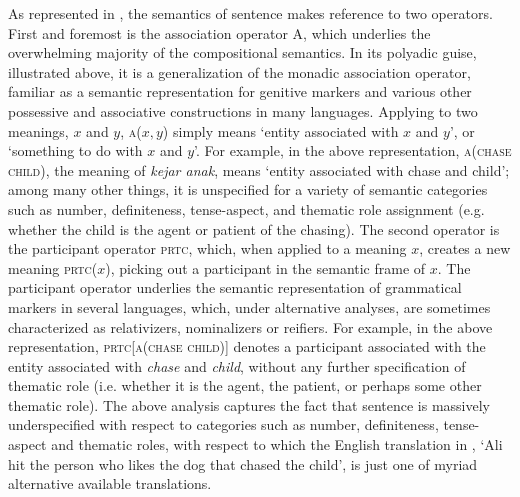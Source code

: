 \documentclass[output=paper]{langscibook}
\begin{document}
As represented in , the semantics of sentence  makes reference to two operators. First and foremost is the association operator A, which underlies the overwhelming majority of the compositional semantics. In its polyadic guise, illustrated above, it is a generalization of the monadic association operator, familiar as a semantic representation for genitive markers and various other possessive and associative constructions in many languages. Applying to two meanings, $x$ and $y$, \textsc{a}($x,y$) simply means `entity associated with $x$ and $y$', or `something to do with $x$ and $y$'. For example, in the above representation, \textsc{a(chase child)}, the meaning of \textit{kejar anak}, means `entity associated with chase and child'; among many other things, it is unspecified for a variety of semantic categories such as number, definiteness, tense-aspect, and thematic role assignment (e.g. whether the child is the agent or patient of the chasing). The second operator is the participant operator \textsc{prtc}, which, when applied to a meaning $x$, creates a new meaning \textsc{prtc}($x$), picking out a participant in the semantic frame of $x$. The participant operator underlies the semantic representation of grammatical markers in several languages, which, under alternative analyses, are sometimes characterized as relativizers, nominalizers or reifiers. For example, in the above representation, \textsc{prtc[a(chase child)]} denotes a participant associated with the entity associated with \textit{chase} and \textit{child}, without any further specification of thematic role (i.e. whether it is the agent, the patient, or perhaps some other thematic role). The above analysis captures the fact that sentence  is massively underspecified with respect to categories such as number, definiteness, tense-aspect and thematic roles, with respect to which the English translation in , `Ali hit the person who likes the dog that chased the child', is just one of myriad alternative available translations.
\end{document}
